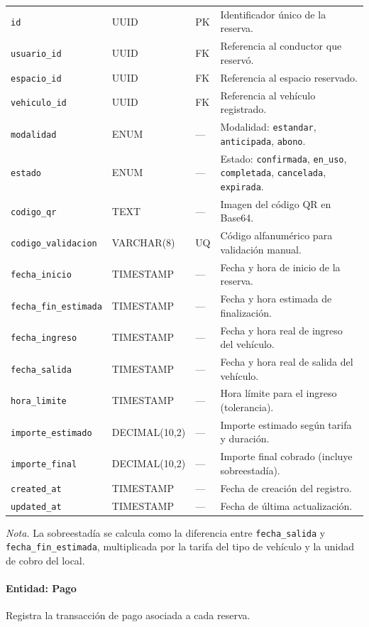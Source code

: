 \begin{longtable}{p{3.5cm} p{2.5cm} p{1.5cm} p{6.5cm}}
\texttt{id} & UUID & PK & Identificador único de la reserva. \\
\texttt{usuario\_id} & UUID & FK & Referencia al conductor que reservó. \\
\texttt{espacio\_id} & UUID & FK & Referencia al espacio reservado. \\
\texttt{vehiculo\_id} & UUID & FK & Referencia al vehículo registrado. \\
\texttt{modalidad} & ENUM & --- & Modalidad: \texttt{estandar}, \texttt{anticipada}, \texttt{abono}. \\
\texttt{estado} & ENUM & --- & Estado: \texttt{confirmada}, \texttt{en\_uso}, \texttt{completada}, \texttt{cancelada}, \texttt{expirada}. \\
\texttt{codigo\_qr} & TEXT & --- & Imagen del código QR en Base64. \\
\texttt{codigo\_validacion} & VARCHAR(8) & UQ & Código alfanumérico para validación manual. \\
\texttt{fecha\_inicio} & TIMESTAMP & --- & Fecha y hora de inicio de la reserva. \\
\texttt{fecha\_fin\_estimada} & TIMESTAMP & --- & Fecha y hora estimada de finalización. \\
\texttt{fecha\_ingreso} & TIMESTAMP & --- & Fecha y hora real de ingreso del vehículo. \\
\texttt{fecha\_salida} & TIMESTAMP & --- & Fecha y hora real de salida del vehículo. \\
\texttt{hora\_limite} & TIMESTAMP & --- & Hora límite para el ingreso (tolerancia). \\
\texttt{importe\_estimado} & DECIMAL(10,2) & --- & Importe estimado según tarifa y duración. \\
\texttt{importe\_final} & DECIMAL(10,2) & --- & Importe final cobrado (incluye sobreestadía). \\
\texttt{created\_at} & TIMESTAMP & --- & Fecha de creación del registro. \\
\texttt{updated\_at} & TIMESTAMP & --- & Fecha de última actualización. \\
\end{longtable}

\textit{Nota.} La sobreestadía se calcula como la diferencia entre \texttt{fecha\_salida} y \texttt{fecha\_fin\_estimada}, multiplicada por la tarifa del tipo de vehículo y la unidad de cobro del local.

\paragraph{Entidad: Pago} Registra la transacción de pago asociada a cada reserva.

